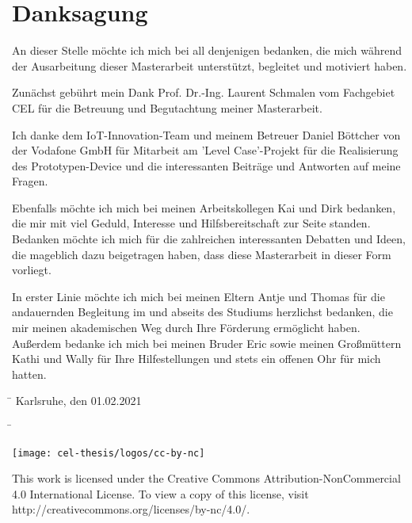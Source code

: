 \ifx\theThesisLanguage\dictThesisLanguageEnglish

\chapter*{Danksagung}

An dieser Stelle möchte ich mich bei all denjenigen bedanken, die mich w{\"a}hrend der Ausarbeitung dieser Masterarbeit unterstützt, begleitet und motiviert haben.

Zun{\"a}chst gebührt mein Dank Prof. Dr.-Ing. Laurent Schmalen vom Fachgebiet CEL für die Betreuung und Begutachtung meiner Masterarbeit.

Ich danke dem IoT-Innovation-Team und meinem Betreuer Daniel B{\"o}ttcher von der Vodafone GmbH für Mitarbeit am 'Level Case'-Projekt für die Realisierung des Prototypen-Device und die interessanten Beiträge und Antworten auf meine Fragen.

Ebenfalls möchte ich mich bei meinen Arbeitskollegen Kai und Dirk bedanken, die mir mit viel Geduld, Interesse und Hilfsbereitschaft zur Seite standen. Bedanken möchte ich mich für die zahlreichen interessanten Debatten und Ideen, die mageblich dazu beigetragen haben, dass diese Masterarbeit in dieser Form vorliegt.

In erster Linie möchte ich mich bei meinen Eltern Antje und Thomas für die andauernden Begleitung im und abseits des Studiums herzlichst bedanken, die mir meinen akademischen Weg durch Ihre Förderung ermöglicht haben. 
Außerdem bedanke ich mich bei meinen Bruder Eric sowie meinen Großmüttern Kathi und Wally für Ihre Hilfestellungen und stets ein offenen Ohr für mich hatten.



\vspace{2cm}
\begin{tabbing}
\hspace{3em}\= \kill
\>Karlsruhe, den 01.02.2021\theThesisSignatureDate
\end{tabbing}

\vspace{2cm}
\begin{tabbing}
\hspace{3em}\= \kill
\>\theThesisAuthor\\[1ex]
\end{tabbing}


\fi

\ifx\theThesisCC\dictThesisTRUE
\newpage
\begin{center}
 \texttt{[image: cel-thesis/logos/cc-by-nc]}
\end{center}

\vspace{1cm}
This work is licensed under the Creative Commons Attribution-NonCommercial 4.0 International License. To view a copy of this license, visit http://creativecommons.org/licenses/by-nc/4.0/.
\fi
